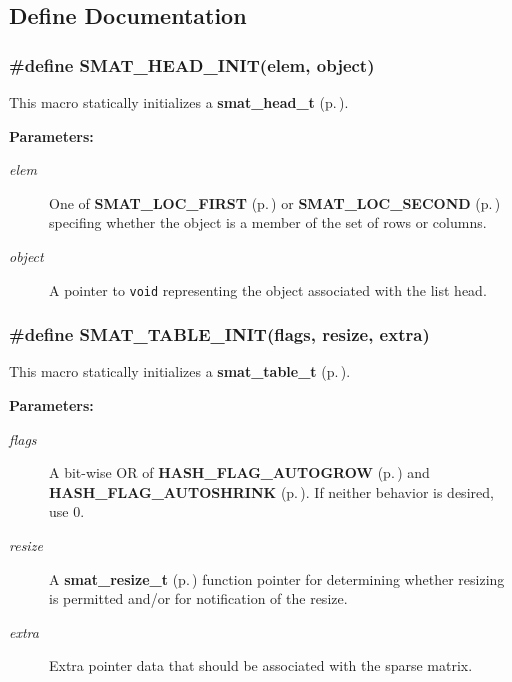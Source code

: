\subsection{Define Documentation}
\subsubsection{\setlength{\rightskip}{0pt plus 5cm}\#define SMAT\_\-HEAD\_\-INIT(elem, object)}\label{group__dbprim__smat_a29}




 This macro statically initializes a {\bf smat\_\-head\_\-t} {\rm (p.\,\pageref{group__dbprim__smat_a1})}.\begin{Desc}
\item[{\bf Parameters: }]\par
\begin{description}
\item[
{\em elem}]One of {\bf SMAT\_\-LOC\_\-FIRST} {\rm (p.\,\pageref{group__dbprim__smat_a48a102})} or {\bf SMAT\_\-LOC\_\-SECOND} {\rm (p.\,\pageref{group__dbprim__smat_a48a103})} specifing whether the object is a member of the set of rows or columns. \item[
{\em object}]A pointer to {\tt void} representing the object associated with the list head. \end{description}
\end{Desc}
\subsubsection{\setlength{\rightskip}{0pt plus 5cm}\#define SMAT\_\-TABLE\_\-INIT(flags, resize, extra)}\label{group__dbprim__smat_a21}




 This macro statically initializes a {\bf smat\_\-table\_\-t} {\rm (p.\,\pageref{group__dbprim__smat_a0})}.\begin{Desc}
\item[{\bf Parameters: }]\par
\begin{description}
\item[
{\em flags}]A bit-wise OR of {\bf HASH\_\-FLAG\_\-AUTOGROW} {\rm (p.\,\pageref{group__dbprim__hash_a16})} and {\bf HASH\_\-FLAG\_\-AUTOSHRINK} {\rm (p.\,\pageref{group__dbprim__hash_a17})}. If neither behavior is desired, use 0. \item[
{\em resize}]A {\bf smat\_\-resize\_\-t} {\rm (p.\,\pageref{group__dbprim__smat_a3})} function pointer for determining whether resizing is permitted and/or for notification of the resize. \item[
{\em extra}]Extra pointer data that should be associated with the sparse matrix. \end{description}
\end{Desc}

